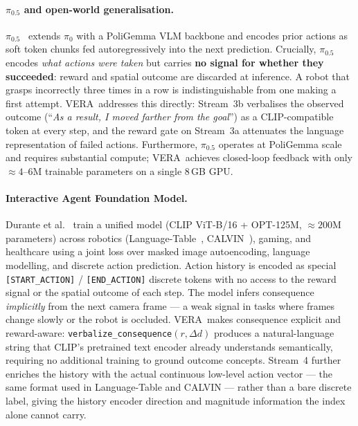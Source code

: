 \documentclass{article}
\newcommand{\modelname}{\textsc{VERA}\xspace}
\begin{document}
\paragraph{$\pi_{0.5}$ and open-world generalisation.}
$\pi_{0.5}$~\citep{hejna2025pi05} extends $\pi_0$ with a PoliGemma VLM
backbone and encodes prior actions as soft token chunks fed
autoregressively into the next prediction.
Crucially, $\pi_{0.5}$ encodes \emph{what actions were taken} but
carries \textbf{no signal for whether they succeeded}: reward and spatial
outcome are discarded at inference.
A robot that grasps incorrectly three times in a row is
indistinguishable from one making a first attempt.
\modelname\ addresses this directly: Stream~3b verbalises the observed
outcome (``\emph{As a result, I moved farther from the goal}'') as a
CLIP-compatible token at every step, and the reward gate on Stream~3a
attenuates the language representation of failed actions.
Furthermore, $\pi_{0.5}$ operates at PoliGemma scale and requires
substantial compute; \modelname\ achieves closed-loop feedback with
only ${\approx}4$--6M trainable parameters on a single 8\,GB GPU.

\paragraph{Interactive Agent Foundation Model.}
Durante et al.~\citep{durante2024agent} train a unified model
(CLIP ViT-B/16 + OPT-125M, ${\approx}200$M parameters) across robotics
(Language-Table~\citep{lynch2023languagetable},
CALVIN~\citep{mees2022calvin}), gaming, and healthcare using a joint loss
over masked image autoencoding, language modelling, and discrete action
prediction.
Action history is encoded as special \texttt{[START\_ACTION]} /
\texttt{[END\_ACTION]} discrete tokens with no access to the reward
signal or the spatial outcome of each step.
The model infers consequence \emph{implicitly} from the next camera
frame — a weak signal in tasks where frames change slowly or the robot
is occluded.
\modelname\ makes consequence explicit and reward-aware:
\texttt{verbalize\_consequence}$(r,\Delta d)$ produces a
natural-language string that CLIP's pretrained text encoder already
understands semantically, requiring no additional training to ground
outcome concepts.
Stream~4 further enriches the history with the actual continuous
low-level action vector — the same format used in Language-Table and
CALVIN — rather than a bare discrete label, giving the history encoder
direction and magnitude information the index alone cannot carry.
\end{document}
